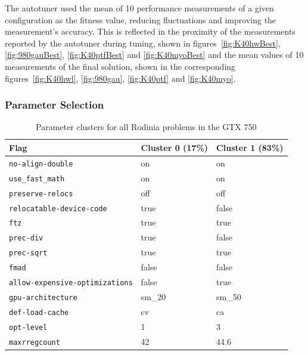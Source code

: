 The autotuner used the mean of 10 performance measurements of a given
configuration as the fitness value, reducing fluctuations and improving the
measurement's accuracy. This is reflected in the proximity of the measurements
reported by the autotuner during tuning, shown in figures~\ref{fig:K40hwBest},
\ref{fig:980gauBest}, \ref{fig:K40ptfBest} and \ref{fig:K40myoBest} and the
mean values of 10 measurements of the final solution, shown in the
corresponding figures~\ref{fig:K40hwl}, \ref{fig:980gau}, \ref{fig:K40ptf} and
\ref{fig:K40myo}.

\subsubsection{Parameter Selection}

\begin{table}[htpb]
    \centering
    \footnotesize
    \begin{tabular}{lll}
        \toprule
        \textbf{Flag} & \textbf{Cluster 0 (17\%)} & \textbf{Cluster 1 (83\%)} \\\midrule
        \texttt{no-align-double}               & on     & on     \\
        \texttt{use\_fast\_math}               & on     & on     \\
        \texttt{preserve-relocs}               & off    & off    \\
        \texttt{relocatable-device-code}       & true   & false  \\
        \texttt{ftz}                           & true   & true   \\
        \texttt{prec-div}                      & true   & false  \\
        \texttt{prec-sqrt}                     & true   & true   \\
        \texttt{fmad}                          & false  & false  \\
        \texttt{allow-expensive-optimizations} & false  & true   \\
        \texttt{gpu-architecture}              & sm\_20 & sm\_50 \\
        \texttt{def-load-cache}                & cv     & ca     \\
        \texttt{opt-level}                     & 1      & 3      \\
        \texttt{maxrregcount}                  & 42     & 44.6   \\\bottomrule
        \end{tabular}
    \caption{Parameter clusters for all Rodinia problems in the GTX 750}
    \label{tab:750RodiniaClusters}
\end{table}


